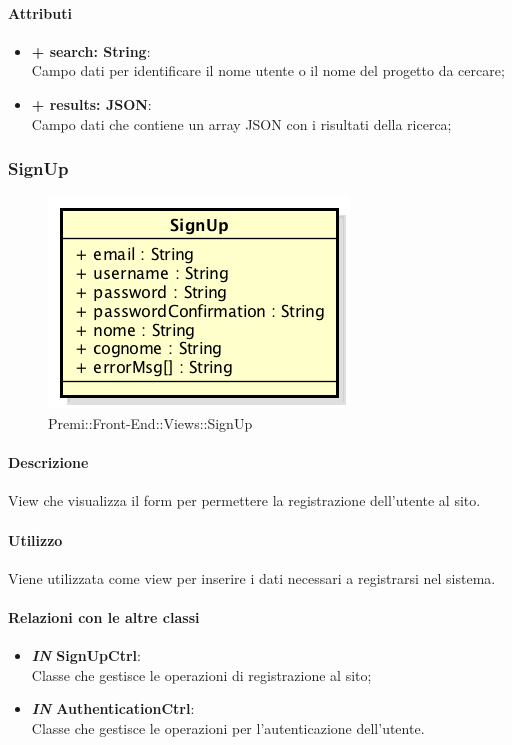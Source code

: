 	\paragraph{Attributi}
	\begin{itemize}
		\item \textbf{+ search: String}:\\
		Campo dati per identificare il nome utente o il nome del progetto da cercare;
		\item \textbf{+ results: JSON}:\\
		Campo dati che contiene un array \gls{JSON} con i risultati della ricerca;
	\end{itemize}
\newpage
	
	
\subsubsection{SignUp}
	\begin{figure}[h]
		\centering
		\includegraphics[width=0.3\linewidth]{img/premi_front_end_views_signup}
		\caption[Premi::Front-End::Views::SignUp]{Premi::Front-End::Views::SignUp}
	\end{figure}
	
	\paragraph{Descrizione}
	View che visualizza il form per permettere la registrazione dell'utente al sito.
	
	\paragraph{Utilizzo}
	Viene utilizzata come view per inserire i dati necessari a registrarsi nel sistema.
	
	\paragraph{Relazioni con le altre classi}
	\begin{itemize}
		\item \textbf{\textit{IN} SignUpCtrl}:\\
		Classe che gestisce le operazioni di registrazione al sito;
		\item \textbf{\textit{IN} AuthenticationCtrl}:\\
		Classe che gestisce le operazioni per l'autenticazione dell'utente.
	\end{itemize}
	
